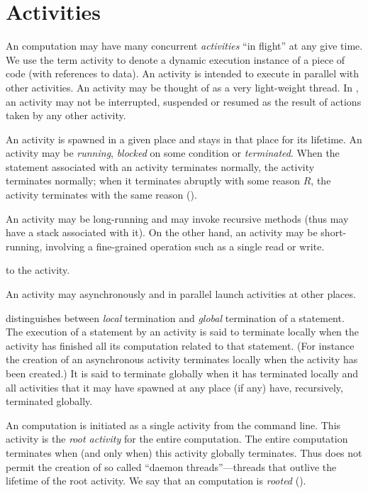 \chapter{Activities}\label{XtenActivities}

An \Xten{} computation may have many concurrent {\em activities} ``in
flight'' at any give time. We use the term activity to denote a
dynamic execution instance of a piece of code (with references to
data). An activity is intended to execute in parallel with other
activities. An activity may be thought of as a very light-weight
thread.  In \XtenCurrVer{}, an activity may not be interrupted,
suspended or resumed as the result of actions taken by any other
activity.

An activity is spawned in a given place and stays in that place for
its lifetime.  An activity may be {\em running}, {\em blocked} on some
condition or {\em terminated}. When the statement associated with an
activity terminates normally, the activity terminates normally; when
it terminates abruptly with some reason $R$, the activity terminates
with the same reason ().

An activity may be long-running and may invoke recursive methods (thus
may have a stack associated with it). On the other hand, an activity
may be short-running, involving a fine-grained operation such as a
single read or write.

to the activity. 

An activity may asynchronously and in parallel launch activities at
other places.

\Xten{} distinguishes between {\em local} termination and {\em global}
termination of a statement. The execution of a statement by an
activity is said to terminate locally when the activity has finished
all its computation related to that statement. (For instance the
creation of an asynchronous activity terminates locally when the
activity has been created.)  It is said to terminate globally when it
has terminated locally and all activities that it may have spawned at
any place (if any) have, recursively, terminated globally.

An \Xten{} computation is initiated as a single activity from the
command line. This activity is the {\em root activity} for the entire computation. The entire computation
terminates when (and only when) this activity globally
terminates. Thus \Xten{} does not permit the creation of so called
``daemon threads''---threads that outlive the lifetime of the root
activity. We say that an \Xten{} computation is {\em rooted}
().

